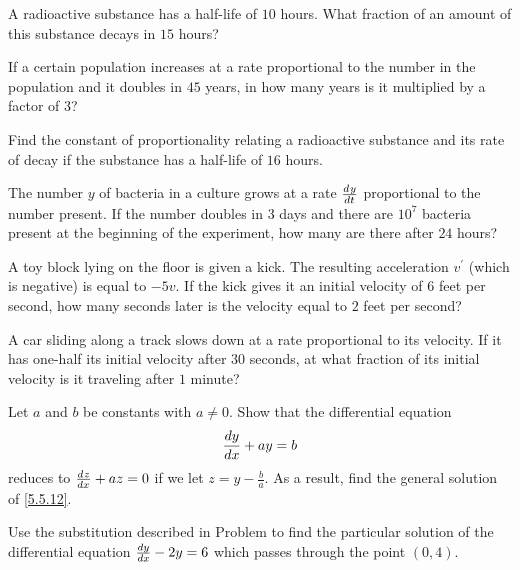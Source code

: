 \begin{exercises}
A radioactive substance has a half-life of
$10$ hours.  What fraction of an amount
of this substance decays in $15$ hours?

If a certain population increases at a rate proportional
to the number in the population and it doubles in
$45$ years, in how many years is it multiplied by
a factor of $3$?

Find the constant of proportionality relating a
radioactive substance and its rate of decay
if the substance has a half-life of $16$ hours.

The number $y$ of bacteria in a culture grows
at a rate $\frac{d^{}{y}}{d{t}^{}}$ proportional to the number
present.  If the number doubles in $3$ days
and there are $10^7$ bacteria present
at the beginning of the experiment,
how many are there after $24$ hours?

A toy block lying on the floor is given a kick.
The resulting acceleration $v^\prime$
(which is negative) is equal to $-5v$.
If the kick gives it an initial velocity of $6$ feet per second,
how many seconds later is the velocity equal to
$2$ feet per second?

A car sliding along a track slows down at a rate
proportional to its velocity.
If it has one-half its initial velocity after $30$
seconds, at what fraction of its initial
velocity is it traveling after $1$ minute?

Let $a$ and $b$ be constants with $a \ne 0$.
Show that the differential equation
\begin{equation}
\label{eq5.5.12}
\frac{d y}{d x} + ay = b
\end{equation}
reduces to $\frac{d^{}{z}}{d{x}^{}} + az = 0$ if we let
$z = y - \frac ba$.
As a result, find the general solution of
\eqref{5.5.12}.

Use the substitution described in Problem 
to find the particular solution of the differential
equation $\frac{d y}{d x} - 2y = 6$ which passes through
the point $(0,4)$.

\end{exercises}
